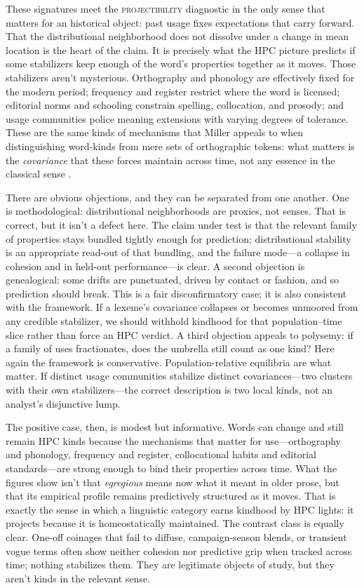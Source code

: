 \documentclass[12pt]{article}
\begin{document}
These signatures meet the \textsc{projectibility} diagnostic in the only sense that matters for an historical object: past usage fixes expectations that carry forward. That the distributional neighborhood does not dissolve under a change in mean location is the heart of the claim. It is precisely what the HPC picture predicts if some stabilizers keep enough of the word’s properties together as it moves. Those stabilizers aren't mysterious. Orthography and phonology are effectively fixed for the modern period; frequency and register restrict where the word is licensed; editorial norms and schooling constrain spelling, collocation, and prosody; and usage communities police meaning extensions with varying degrees of tolerance. These are the same kinds of mechanisms that Miller appeals to when distinguishing word-kinds from mere sets of orthographic tokens: what matters is the \emph{covariance} that these forces maintain across time, not any essence in the classical sense \citep{Miller2021WordsSpeciesKinds}.

There are obvious objections, and they can be separated from one another. One is methodological: distributional neighborhoods are proxies, not senses. That is correct, but it isn't a defect here. The claim under test is that the relevant family of properties stays bundled tightly enough for prediction; distributional stability is an appropriate read-out of that bundling, and the failure mode—a collapse in cohesion and in held-out performance—is clear. A second objection is genealogical: some drifts are punctuated, driven by contact or fashion, and so prediction should break. This is a fair disconfirmatory case; it is also consistent with the framework. If a lexeme’s covariance collapses or becomes unmoored from any credible stabilizer, we should withhold kindhood for that population–time slice rather than force an HPC verdict. A third objection appeals to polysemy: if a family of uses fractionates, does the umbrella still count as one kind? Here again the framework is conservative. Population-relative equilibria are what matter. If distinct usage communities stabilize distinct covariances—two clusters with their own stabilizers—the correct description is two local kinds, not an analyst’s disjunctive lump.

The positive case, then, is modest but informative. Words can change and still remain \textsc{HPC} kinds because the mechanisms that matter for use—orthography and phonology, frequency and register, collocational habits and editorial standards—are strong enough to bind their properties across time. What the figures show isn't that \emph{egregious} means now what it meant in older prose, but that its empirical profile remains predictively structured as it moves. That is exactly the sense in which a linguistic category earns kindhood by HPC lights: it projects because it is homeostatically maintained. The contrast class is equally clear. One-off coinages that fail to diffuse, campaign-season blends, or transient vogue terms often show neither cohesion nor predictive grip when tracked across time; nothing stabilizes them. They are legitimate objects of study, but they aren't kinds in the relevant sense.
\end{document}
